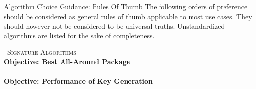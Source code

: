 


\begin{minipage}[t]{0.7\textwidth}
    \vspace{0pt}
    \begin{algorithmbox}{Algorithm Choice Guidance: Rules Of Thumb}
        {\scriptsize The following orders of preference should be considered as general rules of thumb applicable to most use cases. They should however not be considered to be universal truths. Unstandardized algorithms are listed for the sake of completeness.\\}
        \begin{minipage}[t]{0.5\textwidth}
            \vspace{0pt}
            {\scshape \faPen\, Signature Algorithms}\\
            {\scriptsize \bfseries Objective: Best All-Around Package \tbv}\\[0.1\baselineskip]
            \\[0.75\baselineskip]
            {\scriptsize \bfseries Objective: Performance of Key Generation \tbv}\\[0.1\baselineskip]
            \\[0.75\baselineskip]

\end{minipage}
\end{algorithmbox}
\end{minipage}
